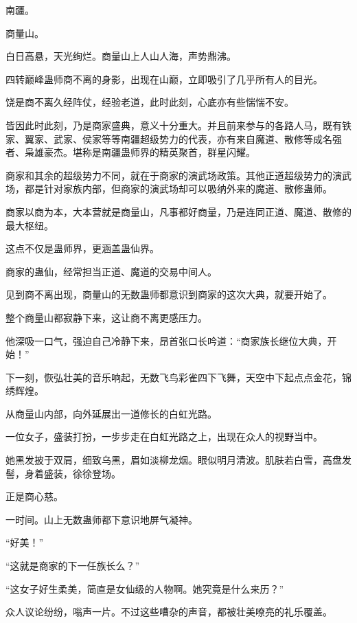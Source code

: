 
\begin{this_body}



南疆。

商量山。

白日高悬，天光绚烂。商量山上人山人海，声势鼎沸。

四转巅峰蛊师商不离的身影，出现在山巅，立即吸引了几乎所有人的目光。

饶是商不离久经阵仗，经验老道，此时此刻，心底亦有些惴惴不安。

皆因此时此刻，乃是商家盛典，意义十分重大。并且前来参与的各路人马，既有铁家、翼家、武家、侯家等等南疆超级势力的代表，亦有来自魔道、散修等成名强者、枭雄豪杰。堪称是南疆蛊师界的精英聚首，群星闪耀。

商家和其余的超级势力不同，就在于商家的演武场政策。其他正道超级势力的演武场，都是针对家族内部，但商家的演武场却可以吸纳外来的魔道、散修蛊师。

商家以商为本，大本营就是商量山，凡事都好商量，乃是连同正道、魔道、散修的最大枢纽。

这点不仅是蛊师界，更涵盖蛊仙界。

商家的蛊仙，经常担当正道、魔道的交易中间人。

见到商不离出现，商量山的无数蛊师都意识到商家的这次大典，就要开始了。

整个商量山都寂静下来，这让商不离更感压力。

他深吸一口气，强迫自己冷静下来，昂首张口长吟道：“商家族长继位大典，开始！”

下一刻，恢弘壮美的音乐响起，无数飞鸟彩雀四下飞舞，天空中下起点点金花，锦绣辉煌。

从商量山内部，向外延展出一道修长的白虹光路。

一位女子，盛装打扮，一步步走在白虹光路之上，出现在众人的视野当中。

她黑发披于双肩，细致乌黑，眉如淡柳龙烟。眼似明月清波。肌肤若白雪，高盘发髻，身着盛装，徐徐登场。

正是商心慈。

一时间。山上无数蛊师都下意识地屏气凝神。

“好美！”

“这就是商家的下一任族长么？”

“这女子好生柔美，简直是女仙级的人物啊。她究竟是什么来历？”

众人议论纷纷，嗡声一片。不过这些嘈杂的声音，都被壮美嘹亮的礼乐覆盖。


\end{this_body}
